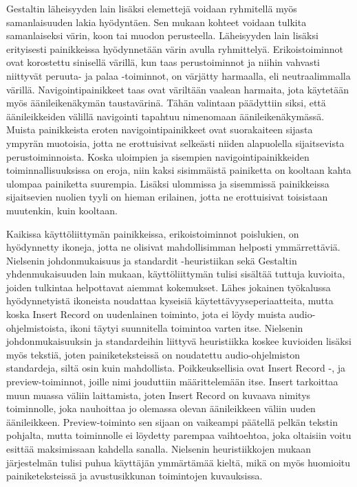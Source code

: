 \documentclass[utf8]{gradu3}
\begin{document}
Gestaltin läheisyyden lain lisäksi elemettejä voidaan ryhmitellä myös samanlaisuuden lakia hyödyntäen. Sen mukaan kohteet voidaan tulkita samanlaiseksi värin, koon tai muodon perusteella. Läheisyyden lain lisäksi erityisesti painikkeissa hyödynnetään värin avulla ryhmittelyä. Erikoistoiminnot ovat korostettu sinisellä värillä, kun taas perustoiminnot ja niihin vahvasti niittyvät peruuta- ja palaa -toiminnot, on värjätty harmaalla, eli neutraalimmalla värillä. Navigointipainikkeet taas ovat väriltään vaalean harmaita, jota käytetään myös äänileikenäkymän taustavärinä. Tähän valintaan päädyttiin siksi, että äänileikkeiden välillä navigointi tapahtuu nimenomaan äänileikenäkymässä. Muista painikkeista eroten navigointipainikkeet ovat suorakaiteen sijasta ympyrän muotoisia, jotta ne erottuisivat selkeästi niiden alapuolella sijaitsevista perustoiminnoista. Koska uloimpien ja sisempien navigointipainikkeiden toiminnallisuuksissa on eroja, niin kaksi sisimmäistä painiketta on kooltaan kahta ulompaa painiketta suurempia. Lisäksi ulommissa ja sisemmissä painikkeissa sijaitsevien nuolien tyyli on hieman erilainen, jotta ne erottuisivat toisistaan muutenkin, kuin kooltaan.

Kaikissa käyttöliittymän painikkeissa, erikoistoiminnot poislukien, on hyödynnetty ikoneja, jotta ne olisivat mahdollisimman helposti ymmärrettäviä. Nielsenin johdonmukaisuus ja standardit -heuristiikan sekä Gestaltin yhdenmukaisuuden lain mukaan, käyttöliittymän tulisi sisältää tuttuja kuvioita, joiden tulkintaa helpottavat aiemmat kokemukset. Lähes jokainen työkalussa hyödynnetyistä ikoneista noudattaa kyseisiä käytettävyyseperiaatteita, mutta koska Insert Record on uudenlainen toiminto, jota ei löydy muista audio-ohjelmistoista, ikoni täytyi suunnitella toimintoa varten itse. Nielsenin johdonmukaisuuksin ja standardeihin liittyvä heuristiikka koskee kuvioiden lisäksi myös tekstiä, joten painiketeksteissä on noudatettu audio-ohjelmiston standardeja, siltä osin kuin mahdollista. Poikkeuksellisia ovat Insert Record -, ja preview-toiminnot, joille nimi jouduttiin määrittelemään itse. Insert tarkoittaa muun muassa väliin laittamista, joten Insert Record on kuvaava nimitys toiminnolle, joka nauhoittaa jo olemassa olevan äänileikkeen väliin uuden äänileikkeen. Preview-toiminto sen sijaan on vaikeampi päätellä pelkän tekstin pohjalta, mutta toiminnolle ei löydetty parempaa vaihtoehtoa, joka oltaisiin voitu esittää maksimissaan kahdella sanalla. Nielsenin heuristiikkojen mukaan järjestelmän tulisi puhua käyttäjän ymmärtämää kieltä, mikä on myös huomioitu painiketeksteissä ja avustusikkunan toimintojen kuvauksissa.
\end{document}
